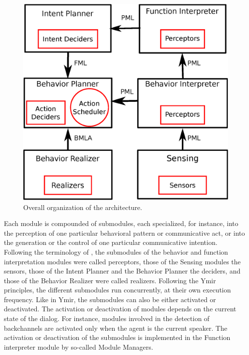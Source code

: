 \begin{figure}
  \centering
  \includegraphics[width=\linewidth]{figure/impl_schema.eps}
  \caption{Overall organization of the architecture.}
  \label{overall_archi}
\end{figure}

Each module is compounded of submodules, each specialized, for instance, into the perception of one particular behavioral pattern or communicative act, or into the generation or the control of one particular communicative intention. Following the terminology of \cite{thorisson_mind_1999}, the submodules of the behavior and function interpretation modules were called perceptors, those of the Sensing modules the sensors, those of the Intent Planner and the Behavior Planner the deciders, and those of the Behavior Realizer were called realizers. 
Following the Ymir principles, the different submodules run concurrently, at their own execution frequency. 
Like in Ymir, the submodules can also be either activated or deactivated. 
The activation or deactivation of modules depends on the current state of the dialog. 
For instance, modules involved in the detection of backchannels are activated only when the agent is the current speaker. 
The activation or deactivation of the submodules is implemented in the Function interpreter module by so-called Module Managers. 

